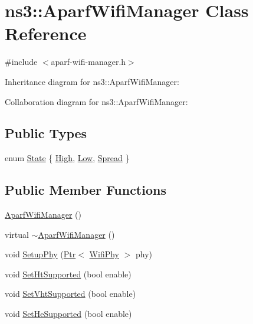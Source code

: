 \hypertarget{classns3_1_1AparfWifiManager}{}\section{ns3\+:\+:Aparf\+Wifi\+Manager Class Reference}
\label{classns3_1_1AparfWifiManager}


{\ttfamily \#include $<$aparf-\/wifi-\/manager.\+h$>$}



Inheritance diagram for ns3\+:\+:Aparf\+Wifi\+Manager\+:


Collaboration diagram for ns3\+:\+:Aparf\+Wifi\+Manager\+:
\subsection*{Public Types}
\begin{DoxyCompactItemize}
\item 
enum \hyperlink{classns3_1_1AparfWifiManager_a5b338779a4468212d544d6830f1a8237}{State} \{ \hyperlink{classns3_1_1AparfWifiManager_a5b338779a4468212d544d6830f1a8237a350c9255ae87bc64460977ff6aa9b45d}{High}, 
\hyperlink{classns3_1_1AparfWifiManager_a5b338779a4468212d544d6830f1a8237adfadee30861b99e197d83af798d5e8b9}{Low}, 
\hyperlink{classns3_1_1AparfWifiManager_a5b338779a4468212d544d6830f1a8237aaad961d0bc4608abdca01806c95e059b}{Spread}
 \}
\end{DoxyCompactItemize}
\subsection*{Public Member Functions}
\begin{DoxyCompactItemize}
\item 
\hyperlink{classns3_1_1AparfWifiManager_ad9b66cb3fdf2af298b42628892d09efd}{Aparf\+Wifi\+Manager} ()
\item 
virtual \hyperlink{classns3_1_1AparfWifiManager_ae93f5af15f53172323f80e68e7569306}{$\sim$\+Aparf\+Wifi\+Manager} ()
\item 
void \hyperlink{classns3_1_1AparfWifiManager_a700e42fed2d5ffb1c0e4b5972b0f7c36}{Setup\+Phy} (\hyperlink{classns3_1_1Ptr}{Ptr}$<$ \hyperlink{classns3_1_1WifiPhy}{Wifi\+Phy} $>$ phy)
\item 
void \hyperlink{classns3_1_1AparfWifiManager_af2f12140d782fbaad4e0c53a9095f340}{Set\+Ht\+Supported} (bool enable)
\item 
void \hyperlink{classns3_1_1AparfWifiManager_a1ba3b090dd047282013ca33904e9c853}{Set\+Vht\+Supported} (bool enable)
\item 
void \hyperlink{classns3_1_1AparfWifiManager_a8ff8346078d3d86bf54316bb29cf2e79}{Set\+He\+Supported} (bool enable)
\end{DoxyCompactItemize}
